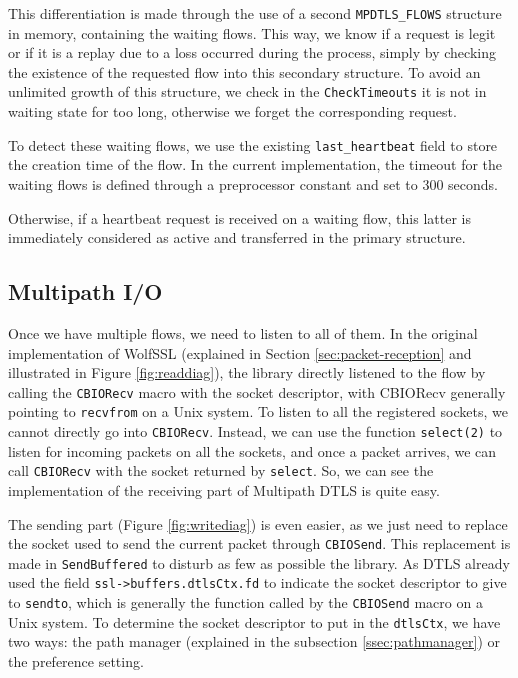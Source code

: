 This differentiation is made through the use of a second \texttt{MPDTLS\_FLOWS} structure in memory, containing the waiting flows. This way, we know if a request is legit or if it is a replay due to a loss occurred during the process, simply by checking the existence of the requested flow into this secondary structure. To avoid an unlimited growth of this structure, we check in the \texttt{CheckTimeouts} it is not in waiting state for too long, otherwise we forget the corresponding request.

To detect these waiting flows, we use the existing \texttt{last\_heartbeat} field to store the creation time of the flow. In the current implementation, the timeout for the waiting flows is defined through a preprocessor constant and set to 300 seconds.

Otherwise, if a heartbeat request is received on a waiting flow, this latter is immediately considered as active and transferred in the primary structure.

\subsection{Multipath I/O}

Once we have multiple flows, we need to listen to all of them. In the original implementation of WolfSSL (explained in Section \ref{sec:packet-reception} and illustrated in Figure \ref{fig:readdiag}), the library directly listened to the flow by calling the \texttt{CBIORecv} macro with the socket descriptor, with CBIORecv generally pointing to \texttt{recvfrom} on a Unix system. To listen to all the registered sockets, we cannot directly go into \texttt{CBIORecv}. Instead, we can use the function \texttt{select(2)} to listen for incoming packets on all the sockets, and once a packet arrives, we can call \texttt{CBIORecv} with the socket returned by \texttt{select}. So, we can see the implementation of the receiving part of Multipath DTLS is quite easy.

The sending part (Figure \ref{fig:writediag}) is even easier, as we just need to replace the socket used to send the current packet through \texttt{CBIOSend}. This replacement is made in \texttt{SendBuffered} to disturb as few as possible the library. As DTLS already used the field \texttt{ssl->buffers.dtlsCtx.fd} to indicate the socket descriptor to give to \texttt{sendto}, which is generally the function called by the \texttt{CBIOSend} macro on a Unix system. To determine the socket descriptor to put in the \texttt{dtlsCtx}, we have two ways: the path manager (explained in the subsection \ref{ssec:pathmanager}) or the preference setting.

